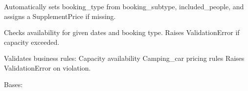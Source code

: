 \documentclass[letterpaper,10pt,english]{sphinxmanual}
\begin{document}
\begin{fulllineitems}

\begin{fulllineitems}
\label{\detokenize{index:bookings.models.Booking.save}}
\pysigstartsignatures
\pysiglinewithargsret
{}
{\sphinxparamcomma {}}
{}
\pysigstopsignatures
\sphinxAtStartPar
Automatically sets booking\_type from booking\_subtype, included\_people,
and assigns a SupplementPrice if missing.

\end{fulllineitems}


\begin{fulllineitems}
\label{\detokenize{index:bookings.models.Booking.check_capacity}}
\pysigstartsignatures
\pysiglinewithargsret
{}
{}
{}
\pysigstopsignatures
\sphinxAtStartPar
Checks availability for given dates and booking type.
Raises ValidationError if capacity exceeded.

\end{fulllineitems}


\begin{fulllineitems}
\label{\detokenize{index:bookings.models.Booking.clean}}
\pysigstartsignatures
\pysiglinewithargsret
{}
{}
{}
\pysigstopsignatures
\sphinxAtStartPar
Validates business rules:
\sphinxhyphen{} Capacity availability
\sphinxhyphen{} Camping\_car pricing rules
Raises ValidationError on violation.

\end{fulllineitems}


\begin{fulllineitems}
\label{\detokenize{index:bookings.models.Booking.DoesNotExist}}
\pysigstartsignatures
\pysigline
{}
\pysigstopsignatures
\sphinxAtStartPar
Bases: 


\end{fulllineitems}
\end{fulllineitems}
\end{document}
